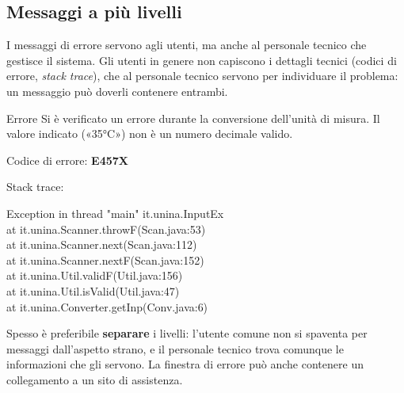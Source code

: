 \subsection{Messaggi a più livelli}

I messaggi di errore servono agli utenti, ma anche al personale tecnico che gestisce il sistema. Gli utenti in genere non
capiscono i dettagli tecnici (codici di errore, \textit{stack trace}), che al personale tecnico servono per individuare
il problema: un messaggio può doverli contenere entrambi.

\begin{center}
\begin{minipage}{0.62\linewidth}
  \begin{finestra}{Errore}
    Si è verificato un errore durante la conversione dell'unità di misura. Il valore indicato («35°C») non è un numero
    decimale valido.\par\smallskip
    Codice di errore: \textbf{E457X}\par
    Stack trace:\par
    {\color{swred}\ttfamily\tiny Exception in thread "main" it.unina.InputEx\\
    \hspace*{1em}at it.unina.Scanner.throwF(Scan.java:53)\\
    \hspace*{1em}at it.unina.Scanner.next(Scan.java:112)\\
    \hspace*{1em}at it.unina.Scanner.nextF(Scan.java:152)\\
    \hspace*{1em}at it.unina.Util.validF(Util.java:156)\\
    \hspace*{1em}at it.unina.Util.isValid(Util.java:47)\\
    \hspace*{1em}at it.unina.Converter.getInp(Conv.java:6)}
  \end{finestra}
\end{minipage}
\end{center}

Spesso è preferibile \textbf{separare} i livelli: l'utente comune non si spaventa per messaggi dall'aspetto strano, e il
personale tecnico trova comunque le informazioni che gli servono. La finestra di errore può anche contenere un
collegamento a un sito di assistenza.

